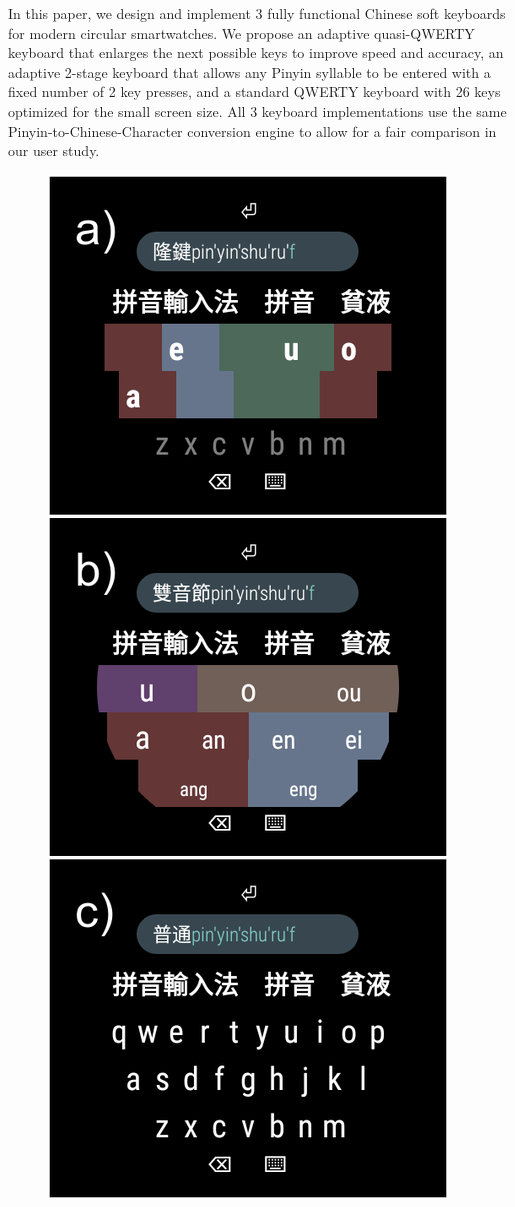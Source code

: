 In this paper, we design and implement 3 fully functional Chinese soft keyboards for modern circular smartwatches. We propose an adaptive quasi-QWERTY keyboard that enlarges the next possible keys to improve speed and accuracy, an adaptive 2-stage keyboard that allows any Pinyin syllable to be entered with a fixed number of 2 key presses, and a standard QWERTY keyboard with 26 keys optimized for the small screen size. All 3 keyboard implementations use the same Pinyin-to-Chinese-Character conversion engine to allow for a fair comparison in our user study.

\begin{figure}
  \centering
  \includegraphics[width=\textwidth,height=0.9\textheight,keepaspectratio]{figures/stripe_banner_layouts}

\end{figure}
